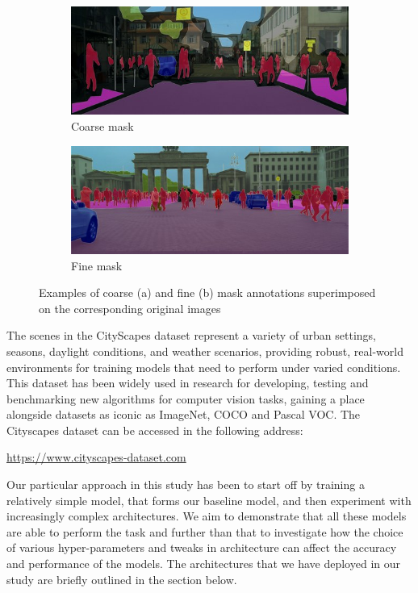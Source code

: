 \begin{figure}[ht]
    \centering
    \begin{subfigure}{0.45\textwidth}
        \centering
        \includegraphics[width=\linewidth]{coarse_example.jpg}
        \caption{Coarse mask}
        \label{fig:sub1}
    \end{subfigure}\hfill
    \begin{subfigure}{0.45\textwidth}
        \centering
        \includegraphics[width=\linewidth]{fine_example.jpg}
        \caption{Fine mask}
        \label{fig:sub2}
    \end{subfigure}
    \caption{Examples of coarse (a) and fine (b) mask annotations superimposed on the corresponding original images}
    \label{fig:cityscapes}
\end{figure}

The scenes in the CityScapes dataset represent a variety of urban settings, seasons, daylight conditions, and weather scenarios, providing robust, real-world environments for training models that need to perform under varied conditions. This dataset has been widely used in research for developing, testing and benchmarking new algorithms for computer vision tasks, gaining a place alongside datasets as iconic as ImageNet, COCO and Pascal VOC. The Cityscapes dataset can be accessed in the following address:
\begin{center}
\url{https://www.cityscapes-dataset.com}
\end{center}
Our particular approach in this study has been to start off by training a relatively simple model, that forms our baseline model, and then experiment with increasingly complex architectures. We aim to demonstrate that all these models are able to perform the task and further than that to investigate how the choice of various hyper-parameters and tweaks in architecture can affect the accuracy and performance of the models. The architectures that we have deployed in our study are briefly outlined in the section below.
